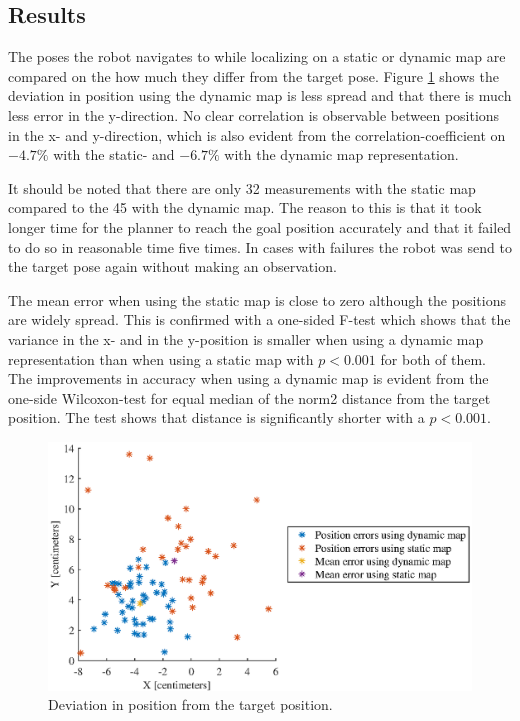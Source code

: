 \subsection{Results}
The poses the robot navigates to while localizing on a static or dynamic map are compared on the how much they differ from the target pose.
Figure \ref{fig:precision_test_positions} shows the deviation in position using the dynamic map is less spread and that there is much less error in the y-direction. 
No clear correlation is observable between positions in the x- and y-direction, which is also evident from the correlation-coefficient on $-4.7\%$ with the static- and $-6.7\%$ with the dynamic map representation. 

It should be noted that there are only 32 measurements with the static map compared to the 45 with the dynamic map.
The reason to this is that it took longer time for the planner to reach the goal position accurately and that it failed to do so in reasonable time five times. 
In cases with failures the robot was send to the target pose again without making an observation. 

The mean error when using the static map is close to zero although the positions are widely spread.
This is confirmed with a one-sided F-test which shows that the variance in the x- and in the y-position is smaller when using a dynamic map representation than when using a static map with $p<0.001$ for both of them.
The improvements in accuracy when using a dynamic map is evident from the one-side Wilcoxon-test for equal median of the norm2 distance from the target position. The test shows that distance is significantly shorter with a $p<0.001$.

\begin{figure}
    \centering
    \includegraphics[scale=1]{chapters/evaluation/figures/precision_test_positions}
    \caption{Deviation in position from the target position.}
    \label{fig:precision_test_positions}
\end{figure}


